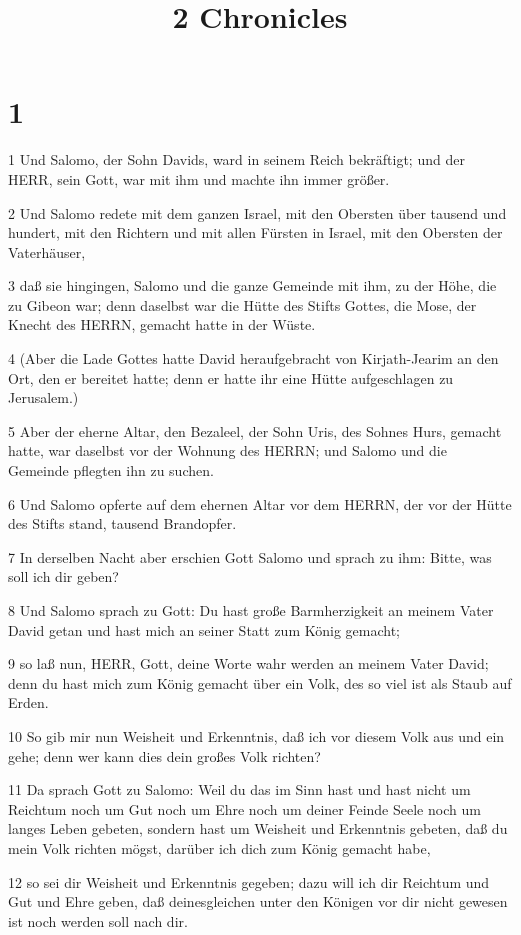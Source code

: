 

\title{2 Chronicles}


\chapter{1}

\par 1 Und Salomo, der Sohn Davids, ward in seinem Reich bekräftigt; und der HERR, sein Gott, war mit ihm und machte ihn immer größer.
\par 2 Und Salomo redete mit dem ganzen Israel, mit den Obersten über tausend und hundert, mit den Richtern und mit allen Fürsten in Israel, mit den Obersten der Vaterhäuser,
\par 3 daß sie hingingen, Salomo und die ganze Gemeinde mit ihm, zu der Höhe, die zu Gibeon war; denn daselbst war die Hütte des Stifts Gottes, die Mose, der Knecht des HERRN, gemacht hatte in der Wüste.
\par 4 (Aber die Lade Gottes hatte David heraufgebracht von Kirjath-Jearim an den Ort, den er bereitet hatte; denn er hatte ihr eine Hütte aufgeschlagen zu Jerusalem.)
\par 5 Aber der eherne Altar, den Bezaleel, der Sohn Uris, des Sohnes Hurs, gemacht hatte, war daselbst vor der Wohnung des HERRN; und Salomo und die Gemeinde pflegten ihn zu suchen.
\par 6 Und Salomo opferte auf dem ehernen Altar vor dem HERRN, der vor der Hütte des Stifts stand, tausend Brandopfer.
\par 7 In derselben Nacht aber erschien Gott Salomo und sprach zu ihm: Bitte, was soll ich dir geben?
\par 8 Und Salomo sprach zu Gott: Du hast große Barmherzigkeit an meinem Vater David getan und hast mich an seiner Statt zum König gemacht;
\par 9 so laß nun, HERR, Gott, deine Worte wahr werden an meinem Vater David; denn du hast mich zum König gemacht über ein Volk, des so viel ist als Staub auf Erden.
\par 10 So gib mir nun Weisheit und Erkenntnis, daß ich vor diesem Volk aus und ein gehe; denn wer kann dies dein großes Volk richten?
\par 11 Da sprach Gott zu Salomo: Weil du das im Sinn hast und hast nicht um Reichtum noch um Gut noch um Ehre noch um deiner Feinde Seele noch um langes Leben gebeten, sondern hast um Weisheit und Erkenntnis gebeten, daß du mein Volk richten mögst, darüber ich dich zum König gemacht habe,
\par 12 so sei dir Weisheit und Erkenntnis gegeben; dazu will ich dir Reichtum und Gut und Ehre geben, daß deinesgleichen unter den Königen vor dir nicht gewesen ist noch werden soll nach dir.

